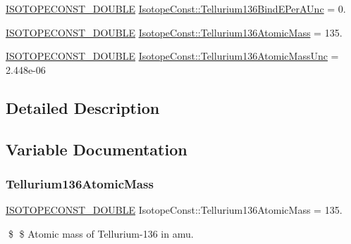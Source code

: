 \begin{DoxyCompactItemize}
\mbox{\hyperlink{group___isotope_const-_macros_ga8f45a7272ce02c0b4c65c44636ed719a}{I\+S\+O\+T\+O\+P\+E\+C\+O\+N\+S\+T\+\_\+\+D\+O\+U\+B\+LE}} \mbox{\hyperlink{group___isotope_const-_tellurium-_te136_gae00f8863c3607adc90550a215bdc71f1}{Isotope\+Const\+::\+Tellurium136\+Bind\+E\+Per\+A\+Unc}} = 0.
\item 
\mbox{\hyperlink{group___isotope_const-_macros_ga8f45a7272ce02c0b4c65c44636ed719a}{I\+S\+O\+T\+O\+P\+E\+C\+O\+N\+S\+T\+\_\+\+D\+O\+U\+B\+LE}} \mbox{\hyperlink{group___isotope_const-_tellurium-_te136_ga4c4e6c344e0035bc7c29932779402ee1}{Isotope\+Const\+::\+Tellurium136\+Atomic\+Mass}} = 135.
\item 
\mbox{\hyperlink{group___isotope_const-_macros_ga8f45a7272ce02c0b4c65c44636ed719a}{I\+S\+O\+T\+O\+P\+E\+C\+O\+N\+S\+T\+\_\+\+D\+O\+U\+B\+LE}} \mbox{\hyperlink{group___isotope_const-_tellurium-_te136_ga1f2260e240c146b5ebbd0bcce7c8dc3d}{Isotope\+Const\+::\+Tellurium136\+Atomic\+Mass\+Unc}} = 2.\+448e-\/06
\end{DoxyCompactItemize}


\subsection{Detailed Description}


\subsection{Variable Documentation}
\mbox{\label{group___isotope_const-_tellurium-_te136_ga4c4e6c344e0035bc7c29932779402ee1}} 
\subsubsection{\texorpdfstring{Tellurium136\+Atomic\+Mass}{Tellurium136AtomicMass}}
{\footnotesize\ttfamily \mbox{\hyperlink{group___isotope_const-_macros_ga8f45a7272ce02c0b4c65c44636ed719a}{I\+S\+O\+T\+O\+P\+E\+C\+O\+N\+S\+T\+\_\+\+D\+O\+U\+B\+LE}} Isotope\+Const\+::\+Tellurium136\+Atomic\+Mass = 135.}

\$ \$ Atomic mass of Tellurium-\/136 in amu. \mbox{\label{group___isotope_const-_tellurium-_te136_ga1f2260e240c146b5ebbd0bcce7c8dc3d}} 
